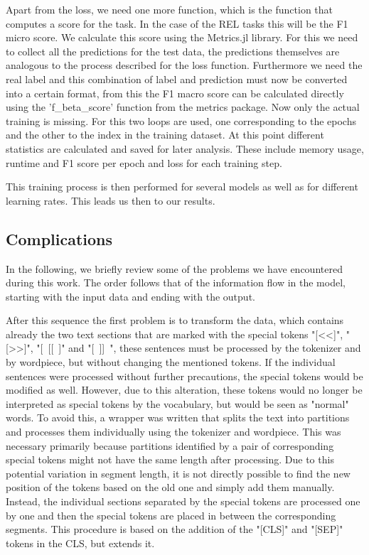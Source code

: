 Apart from the loss, we need one more function, which is the function that computes a score for the task. In the case of the REL tasks this will be the F1 micro score. We calculate this score using the Metrics.jl library. For this we need to collect all the predictions for the test data, the predictions themselves are analogous to the process described for the loss function. Furthermore we need the real label and this combination of label and prediction must now be converted into a certain format, from this the F1 macro score can be calculated directly using the 'f\_beta\_score' function from the metrics package.  
Now only the actual training is missing. For this two loops are used, one corresponding to the epochs and the other to the index in the training dataset. At this point different statistics are calculated and saved for later analysis. These include memory usage, runtime and F1 score per epoch and loss for each training step. 

This training process is then performed for several models as well as for different learning rates. This leads us then to our results. 

\subsection{Complications}
In the following, we briefly review some of the problems we have encountered during this work. The order follows that of the information flow in the model, starting with the input data and ending with the output. 

After this sequence the first problem is to transform the data, which contains already the two text sections that are marked with the special tokens "[\textless\textless]", "[\textgreater\textgreater]", "[~[[~]" and "[~]]~", these sentences must be processed by the tokenizer and by wordpiece, but without changing the mentioned tokens. If the individual sentences were processed without further precautions, the special tokens would be modified as well. However, due to this alteration, these tokens would no longer be interpreted as special tokens by the vocabulary, but would be seen as "normal" words. To avoid this, a wrapper was written that splits the text into partitions and processes them individually using the tokenizer and wordpiece. This was necessary primarily because partitions identified by a pair of corresponding special tokens might not have the same length after processing. Due to this potential variation in segment length, it is not directly possible to find the new position of the tokens based on the old one and simply add them manually. Instead, the individual sections separated by the special tokens are processed one by one and then the special tokens are placed in between the corresponding segments. This procedure is based on the addition of the "[CLS]" and "[SEP]" tokens in the CLS, but extends it. 

